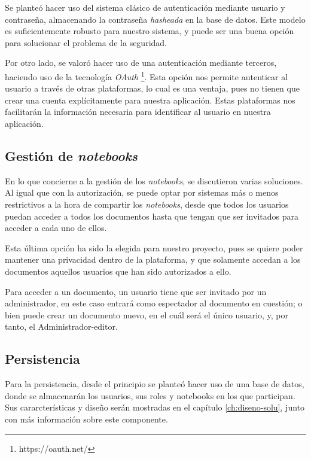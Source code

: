 \documentclass[11pt,spanish,listoffigures]{tfgetsinf}
\begin{document}
Se planteó hacer uso del sistema clásico de autenticación mediante usuario y contraseña, almacenando la contraseña \textit{\gls{hash}eada} en la base de datos. Este modelo es suficientemente robusto para nuestro sistema, y puede ser una buena opción para solucionar el problema de la seguridad.

Por otro lado, se valoró hacer uso de una autenticación mediante terceros, haciendo uso de la tecnología \textit{OAuth} \footnote{https://oauth.net/}. Esta opción nos permite autenticar al usuario a través de otras plataformas, lo cual es una ventaja, pues no tienen que crear una cuenta explícitamente para nuestra aplicación. Estas plataformas nos facilitarán la información necesaria para identificar al usuario en nuestra aplicación.


\subsection{Gestión de \textit{notebooks}}
\label{subsec:comparticion}

En lo que concierne a la gestión de los \textit{notebooks}, se discutieron varias soluciones. Al igual que con la autorización, se puede optar por sistemas más o menos restrictivos a la hora de compartir los \textit{notebooks}, desde que todos los usuarios puedan acceder a todos los documentos hasta que tengan que ser invitados para acceder a cada uno de ellos.

Esta última opción ha sido la elegida para nuestro proyecto, pues se quiere poder mantener una privacidad dentro de la plataforma, y que solamente accedan a los documentos aquellos usuarios que han sido autorizados a ello.

Para acceder a un documento, un usuario tiene que ser invitado por un administrador, en este caso entrará como espectador al documento en cuestión; o bien puede crear un documento nuevo, en el cuál será el único usuario, y, por tanto, el Administrador-editor.


\subsection{Persistencia}
\label{subsec:persistencia}

Para la persistencia, desde el principio se planteó hacer uso de una base de datos, donde se almacenarán los usuarios, sus roles y notebooks en los que participan. Sus cararcterísticas y diseño serán mostradas en el capítulo \ref{ch:diseno-solu}, junto con más información sobre este componente.
\end{document}
